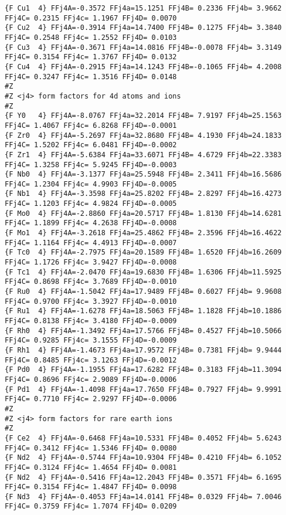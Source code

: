 {\begin{verbatim}
{F Cu1  4} FFj4A=-0.3572 FFj4a=15.1251 FFj4B= 0.2336 FFj4b= 3.9662 FFj4C= 0.2315 FFj4c= 1.1967 FFj4D= 0.0070 
{F Cu2  4} FFj4A=-0.3914 FFj4a=14.7400 FFj4B= 0.1275 FFj4b= 3.3840 FFj4C= 0.2548 FFj4c= 1.2552 FFj4D= 0.0103 
{F Cu3  4} FFj4A=-0.3671 FFj4a=14.0816 FFj4B=-0.0078 FFj4b= 3.3149 FFj4C= 0.3154 FFj4c= 1.3767 FFj4D= 0.0132 
{F Cu4  4} FFj4A=-0.2915 FFj4a=14.1243 FFj4B=-0.1065 FFj4b= 4.2008 FFj4C= 0.3247 FFj4c= 1.3516 FFj4D= 0.0148 
#Z
#Z <j4> form factors for 4d atoms and ions
#Z
{F Y0   4} FFj4A=-8.0767 FFj4a=32.2014 FFj4B= 7.9197 FFj4b=25.1563 FFj4C= 1.4067 FFj4c= 6.8268 FFj4D=-0.0001 
{F Zr0  4} FFj4A=-5.2697 FFj4a=32.8680 FFj4B= 4.1930 FFj4b=24.1833 FFj4C= 1.5202 FFj4c= 6.0481 FFj4D=-0.0002 
{F Zr1  4} FFj4A=-5.6384 FFj4a=33.6071 FFj4B= 4.6729 FFj4b=22.3383 FFj4C= 1.3258 FFj4c= 5.9245 FFj4D=-0.0003 
{F Nb0  4} FFj4A=-3.1377 FFj4a=25.5948 FFj4B= 2.3411 FFj4b=16.5686 FFj4C= 1.2304 FFj4c= 4.9903 FFj4D=-0.0005 
{F Nb1  4} FFj4A=-3.3598 FFj4a=25.8202 FFj4B= 2.8297 FFj4b=16.4273 FFj4C= 1.1203 FFj4c= 4.9824 FFj4D=-0.0005 
{F Mo0  4} FFj4A=-2.8860 FFj4a=20.5717 FFj4B= 1.8130 FFj4b=14.6281 FFj4C= 1.1899 FFj4c= 4.2638 FFj4D=-0.0008 
{F Mo1  4} FFj4A=-3.2618 FFj4a=25.4862 FFj4B= 2.3596 FFj4b=16.4622 FFj4C= 1.1164 FFj4c= 4.4913 FFj4D=-0.0007 
{F Tc0  4} FFj4A=-2.7975 FFj4a=20.1589 FFj4B= 1.6520 FFj4b=16.2609 FFj4C= 1.1726 FFj4c= 3.9427 FFj4D=-0.0008 
{F Tc1  4} FFj4A=-2.0470 FFj4a=19.6830 FFj4B= 1.6306 FFj4b=11.5925 FFj4C= 0.8698 FFj4c= 3.7689 FFj4D=-0.0010 
{F Ru0  4} FFj4A=-1.5042 FFj4a=17.9489 FFj4B= 0.6027 FFj4b= 9.9608 FFj4C= 0.9700 FFj4c= 3.3927 FFj4D=-0.0010 
{F Ru1  4} FFj4A=-1.6278 FFj4a=18.5063 FFj4B= 1.1828 FFj4b=10.1886 FFj4C= 0.8138 FFj4c= 3.4180 FFj4D=-0.0009 
{F Rh0  4} FFj4A=-1.3492 FFj4a=17.5766 FFj4B= 0.4527 FFj4b=10.5066 FFj4C= 0.9285 FFj4c= 3.1555 FFj4D=-0.0009 
{F Rh1  4} FFj4A=-1.4673 FFj4a=17.9572 FFj4B= 0.7381 FFj4b= 9.9444 FFj4C= 0.8485 FFj4c= 3.1263 FFj4D=-0.0012 
{F Pd0  4} FFj4A=-1.1955 FFj4a=17.6282 FFj4B= 0.3183 FFj4b=11.3094 FFj4C= 0.8696 FFj4c= 2.9089 FFj4D=-0.0006 
{F Pd1  4} FFj4A=-1.4098 FFj4a=17.7650 FFj4B= 0.7927 FFj4b= 9.9991 FFj4C= 0.7710 FFj4c= 2.9297 FFj4D=-0.0006 
#Z
#Z <j4> form factors for rare earth ions
#Z
{F Ce2  4} FFj4A=-0.6468 FFj4a=10.5331 FFj4B= 0.4052 FFj4b= 5.6243 FFj4C= 0.3412 FFj4c= 1.5346 FFj4D= 0.0080 
{F Nd2  4} FFj4A=-0.5744 FFj4a=10.9304 FFj4B= 0.4210 FFj4b= 6.1052 FFj4C= 0.3124 FFj4c= 1.4654 FFj4D= 0.0081 
{F Nd2  4} FFj4A=-0.5416 FFj4a=12.2043 FFj4B= 0.3571 FFj4b= 6.1695 FFj4C= 0.3154 FFj4c= 1.4847 FFj4D= 0.0098 
{F Nd3  4} FFj4A=-0.4053 FFj4a=14.0141 FFj4B= 0.0329 FFj4b= 7.0046 FFj4C= 0.3759 FFj4c= 1.7074 FFj4D= 0.0209 

\end{verbatim}}
